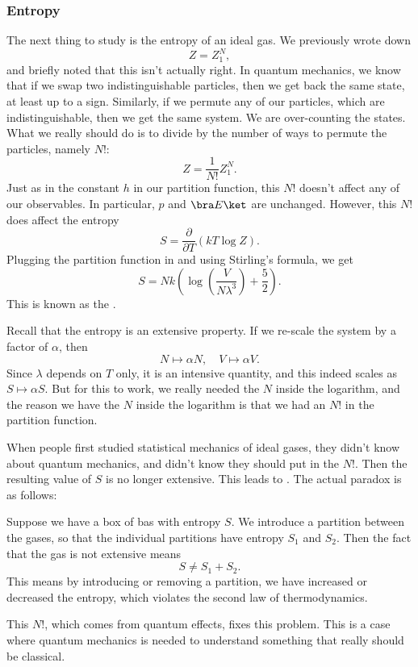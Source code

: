 \documentclass[a4paper]{article}
\begin{document}
\subsubsection*{Entropy}
The next thing to study is the entropy of an ideal gas. We previously wrote down
\[
  Z = Z_1^N,
\]
and briefly noted that this isn't actually right. In quantum mechanics, we know that if we swap two indistinguishable particles, then we get back the same state, at least up to a sign. Similarly, if we permute any of our particles, which are indistinguishable, then we get the same system. We are over-counting the states. What we really should do is to divide by the number of ways to permute the particles, namely $N!$:
\[
  Z = \frac{1}{N!} Z_1^N.
\]
Just as in the constant $h$ in our partition function, this $N!$ doesn't affect any of our observables. In particular, $p$ and $\bra E\ket$ are unchanged. However, this $N!$ does affect the entropy
\[
  S = \frac{\partial}{\partial T} (kT \log Z).
\]
Plugging the partition function in and using Stirling's formula, we get
\[
  S = Nk \left(\log \left(\frac{V}{N\lambda^3}\right) + \frac{5}{2}\right).
\]
This is known as the .

Recall that the entropy is an extensive property. If we re-scale the system by a factor of $\alpha$, then
\[
  N \mapsto \alpha N,\quad V \mapsto \alpha V.
\]
Since $\lambda$ depends on $T$ only, it is an intensive quantity, and this indeed scales as $S \mapsto \alpha S$. But for this to work, we really needed the $N$ inside the logarithm, and the reason we have the $N$ inside the logarithm is that we had an $N!$ in the partition function.

When people first studied statistical mechanics of ideal gases, they didn't know about quantum mechanics, and didn't know they should put in the $N!$. Then the resulting value of $S$ is no longer extensive. This leads to . The actual paradox is as follows:

Suppose we have a box of bas with entropy $S$. We introduce a partition between the gases, so that the individual partitions have entropy $S_1$ and $S_2$. Then the fact that the gas is not extensive means
\[
  S \not= S_1 + S_2.
\]
This means by introducing or removing a partition, we have increased or decreased the entropy, which violates the second law of thermodynamics.

This $N!$, which comes from quantum effects, fixes this problem. This is a case where quantum mechanics is needed to understand something that really should be classical.
\end{document}
